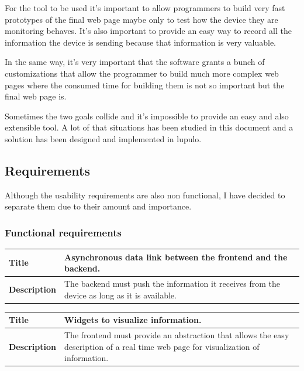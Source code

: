 \documentclass[12pt]{article}
\begin{document}
            For the tool to be used it's important to allow programmers to build
            very fast prototypes of the final web page maybe only to test how
            the device they are monitoring behaves. It's also important to
            provide an easy way to record all the information the device is
            sending because that information is very valuable.

            In the same way, it's very important that the software grants a
            bunch of customizations that allow the programmer to build much more
            complex web pages where the consumed time for building them is not
            so important but the final web page is.

            Sometimes the two goals collide and it's impossible to provide an
            easy and also extensible tool. A lot of that situations has been
            studied in this document and a solution has been designed and
            implemented in lupulo.

        \subsection{Requirements}
            Although the usability requirements are also non functional, I have
            decided to separate them due to their amount and importance.

            \subsubsection{Functional requirements}
                \setlength{\parindent}{0cm}
                \begin{tabularx}{\textwidth}{|l|X|}
                    \hline
                    \textbf{Title} & Asynchronous data link between the frontend
                    and the backend. \\
                    \hline
                    \textbf{Description} & The backend must push the information
                    it receives from the device as long as it is available. \\
                    \hline
                \end{tabularx}

                \begin{tabularx}{\textwidth}{|l|X|}
                    \hline
                    \textbf{Title} & Widgets to visualize information. \\
                    \hline
                    \textbf{Description} & The frontend must provide an
                    abstraction that allows the easy description of a real time
                    web page for visualization of information. \\
                    \hline
                \end{tabularx}
\end{document}
